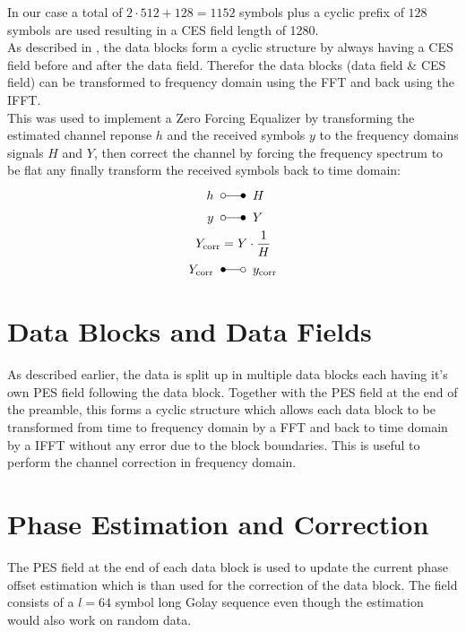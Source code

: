 In our case a total of $2 \cdot 512 + 128 = 1152$ symbols plus
a cyclic prefix of $128$ symbols are used resulting in a \gls{CES} field
length of 1280. \\

As described in , the data blocks form a cyclic
structure by always having a \gls{CES} field before and after the data field.
Therefor the data blocks (data field \& \gls{CES} field) can be transformed
to frequency domain using the \gls{FFT} and back using the \gls{IFFT}. \\

This was used to implement a Zero Forcing Equalizer
by transforming
the estimated channel reponse $h$ and the received symbols $y$
to the frequency domains signals $H$ and $Y$, then correct the channel
by forcing the frequency spectrum to be flat any finally transform
the received symbols back to time domain: \\

\begin{align}
  h \;\;&\laplace\;\; H \\
  y \;\;&\laplace\;\; Y \\
  Y_{\text{corr}} &= Y \cdot \frac{1}{H} \\
  Y_{\text{corr}} \;\;&\Laplace\;\; y_{\text{corr}}
\end{align}

\section{Data Blocks and Data Fields}
\label{sec:sys_data}

As described earlier, the data is split up in multiple data blocks
each having it's own \gls{PES} field following the data block.
Together with the \gls{PES} field at the end of the preamble, this forms
a cyclic structure which allows each data block to be transformed
from time to frequency domain by a \gls{FFT} and back to time domain
by a \gls{IFFT} without any error due to the block boundaries.
This is useful to perform the channel correction in frequency domain. \\

\section{Phase Estimation and Correction}
\label{sec:sys_pes}

The \gls{PES} field at the end of each data block is used to update
the current phase offset estimation which is than used for the correction
of the data block. The field consists of a $l=64$ symbol long Golay
sequence even though the estimation would also work on random data. \\


